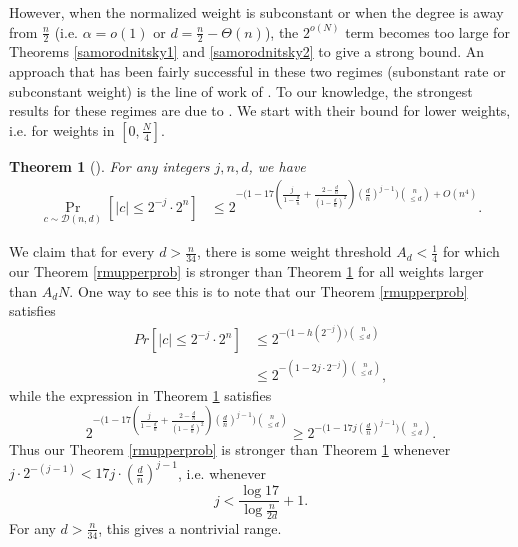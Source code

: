 \documentclass[12pt]{article}
\newtheorem{theorem}{Theorem}
\begin{document}
However, when the normalized weight is subconstant or when the degree is away from $\frac{n}{2}$ (i.e. $\alpha=o(1)$ or $d=\frac{n}{2}-\Theta(n)$), the $2^{o(N)}$ term becomes too large for Theorems \ref{samorodnitsky1} and \ref{samorodnitsky2} to give a strong bound. An approach that has been fairly successful in these two regimes (subonstant rate or subconstant weight) is the line of work of \cite{kaufman2012constantdegree,abbe2015RMlowrate,sberlo2020weightbound}. 
To our knowledge, the strongest results for these regimes are due to \cite{sberlo2020weightbound}. We start with their bound for lower weights, i.e. for weights in $[0,\frac{N}{4}].$
\begin{theorem}[\cite{sberlo2020weightbound}]\label{ss1}
For any integers $j,n,d$, we have
\begin{align*}
 \Pr_{c\sim\mathcal{D}(n,d)}[|c|\leq 2^{-j}\cdot 2^n]&\leq
2^{-\big(  1-17(\frac{j}{1-\frac{d}{n}}+\frac{2-\frac{d}{n}}{(1-\frac{d}{n})^2})(\frac{d}{n})^{j-1} \big)\binom{n}{\leq d} + O(n^4)}.
\end{align*}
\end{theorem}
We claim that for every $d> \frac{n}{34}$, there is some weight threshold $A_d<\frac{1}{4}$ for which our Theorem \ref{rmupperprob} is stronger than Theorem \ref{ss1} for all weights larger than $ A_d N$. 
One way to see this is to note that our Theorem \ref{rmupperprob} satisfies
\begin{align*}
Pr[|c|\leq 2^{-j}\cdot 2^n]&\leq 2^{-\big( 1-h(2^{-j})  \big)\binom{n}{\leq d}}\\
&\leq 2^{-( 1-2j\cdot2^{-j})\binom{n}{\leq d}},
\end{align*}
while the expression in Theorem \ref{ss1} satisfies
$$2^{-\big(  1-17(\frac{j}{1-\frac{d}{n}}+\frac{2-\frac{d}{n}}{(1-\frac{d}{n})^2})(\frac{d}{n})^{j-1} \big)\binom{n}{\leq d} }\geq 2^{-\big( 1-17j(\frac{d}{n})^{j-1} \big)\binom{n}{\leq d} }.$$
Thus our Theorem \ref{rmupperprob} is stronger than Theorem \ref{ss1} whenever $j\cdot2^{-(j-1)}<17j\cdot(\frac{d}{n})^{j-1}$, i.e. whenever
$$j<\frac{\log 17}{\log\frac{n}{2d}}+1.$$
For any $d>\frac{n}{34}$, this gives a nontrivial range. 
\end{document}
